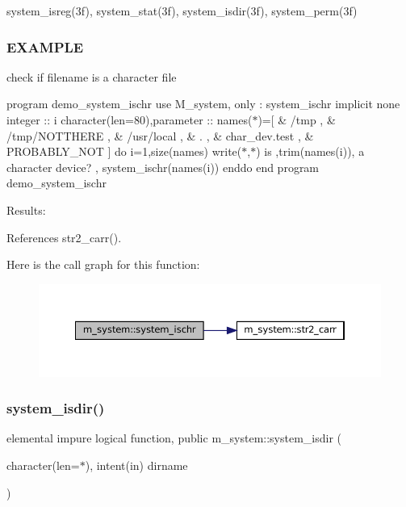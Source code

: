 system\+\_\+isreg(3f), system\+\_\+stat(3f), system\+\_\+isdir(3f), system\+\_\+perm(3f)

\subsubsection*{E\+X\+A\+M\+P\+LE}

check if filename is a character file

program demo\+\_\+system\+\_\+ischr use M\+\_\+system, only \+: system\+\_\+ischr implicit none integer \+:\+: i character(len=80),parameter \+:\+: names($\ast$)=\mbox{[} \& \textquotesingle{}/tmp \textquotesingle{}, \& \textquotesingle{}/tmp/\+N\+O\+T\+T\+H\+E\+RE \textquotesingle{}, \& \textquotesingle{}/usr/local \textquotesingle{}, \& \textquotesingle{}. \textquotesingle{}, \& \textquotesingle{}char\+\_\+dev.\+test \textquotesingle{}, \& \textquotesingle{}P\+R\+O\+B\+A\+B\+L\+Y\+\_\+\+N\+OT \textquotesingle{}\mbox{]} do i=1,size(names) write($\ast$,$\ast$)\textquotesingle{} is \textquotesingle{},trim(names(i)),\textquotesingle{} a character device? \textquotesingle{}, system\+\_\+ischr(names(i)) enddo end program demo\+\_\+system\+\_\+ischr

Results\+: 

References str2\+\_\+carr().

Here is the call graph for this function\+:\nopagebreak
\begin{figure}[H]
\begin{center}
\leavevmode
\includegraphics[width=350pt]{namespacem__system_a49f1d027d438aab86024660b0802768f_cgraph}
\end{center}
\end{figure}
\mbox{\label{namespacem__system_a7946ea976f399baff21caebcbe931f6d}} 
\subsubsection{\texorpdfstring{system\+\_\+isdir()}{system\_isdir()}}
{\footnotesize\ttfamily elemental impure logical function, public m\+\_\+system\+::system\+\_\+isdir (\begin{DoxyParamCaption}\item[{character(len=$\ast$), intent(in)}]{dirname }\end{DoxyParamCaption})}



